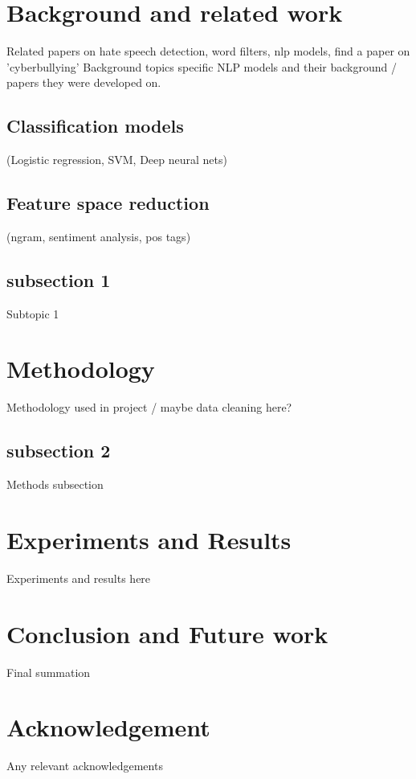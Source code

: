 \documentclass[conference]{IEEEtran}
\begin{document}
\section{Background and related work}
Related papers on hate speech detection, word filters, nlp models, find a paper on 'cyberbullying'
Background topics
specific NLP models and their background / papers they were developed on.

\subsection{Classification models}
(Logistic regression, SVM, Deep neural nets)

\subsection{Feature space reduction}
(ngram, sentiment analysis, pos tags)

\subsection{subsection 1}
Subtopic 1

\section{Methodology}
Methodology used in project / maybe data cleaning here?

\subsection{subsection 2}\label{AA}
Methods subsection

\section{Experiments and Results}
Experiments and results here

\section{Conclusion and Future work}
Final summation

\section*{Acknowledgement}

Any relevant acknowledgements
\end{document}
